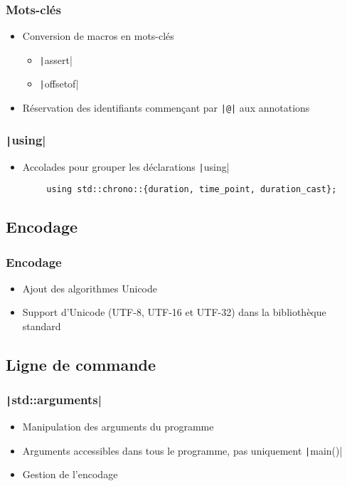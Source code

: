 \documentclass[C++.tex]{subfiles}
\begin{document}
\begin{frame}[fragile]
	\frametitle{Mots-clés}
	\begin{itemize}
		\item Conversion de macros en mots-clés
		\begin{itemize}
			\item \texttt|assert|
			\item \texttt|offsetof|
		\end{itemize}
		\item Réservation des identifiants commençant par \texttt{|@|} aux annotations
	\end{itemize}

\end{frame}

\begin{frame}[fragile]
	\frametitle{\texttt|using|}
	\begin{itemize}
		\item Accolades pour grouper les déclarations  \texttt|using|
	\end{itemize}

	\begin{verbatim}
		using std::chrono::{duration, time_point, duration_cast};
	\end{verbatim}

\end{frame}


\subsection*{Encodage}
\begin{frame}[fragile]
	\frametitle{Encodage}
	\begin{itemize}
		\item Ajout des algorithmes Unicode


		\item Support d'Unicode (UTF-8, UTF-16 et UTF-32) dans la bibliothèque standard
	\end{itemize}
\end{frame}

\subsection*{Ligne de commande}
\begin{frame}[fragile]
	\frametitle{\texttt|std::arguments|}
	\begin{itemize}
		\item Manipulation des arguments du programme
		\item Arguments accessibles dans tous le programme, pas uniquement \texttt|main()|
		\item Gestion de l'encodage
	\end{itemize}

\end{frame}
\end{document}
